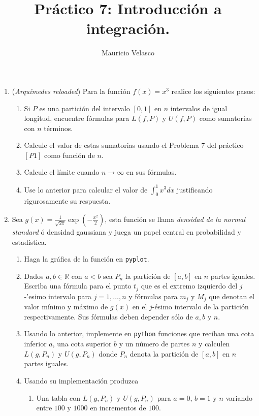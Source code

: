 \documentclass[12pt, a4paper]{article}
\date{}
\begin{document}
\title{Pr\'actico 7: Introducción a integración.}
\author{Mauricio Velasco}
\maketitle{}
\begin{enumerate}
\item ({\it Arquímedes reloaded}) Para la función $f(x)=x^3$ realice los siguientes pasos:
\begin{enumerate}
\item Si $P$ es una partición del intervalo $[0,1]$ en $n$ intervalos de igual longitud, encuentre fórmulas para $L(f,P)$ y $U(f,P)$ como sumatorias con $n$ términos.
\item Calcule el valor de estas sumatorias usando el Problema $7$ del práctico $[P1]$ como función de $n$.
\item Calcule el límite cuando $n\rightarrow \infty$ en sus f\'ormulas.
\item Use lo anterior para calcular el valor de $\int_0^1x^3 dx$ justificando rigurosamente su respuesta.
\end{enumerate}

\item Sea $g(x)=\frac{1}{\sqrt{2\pi}}\exp\left({-\frac{x^2}{2}}\right)$, esta función se llama \emph{densidad de la normal standard} ó densidad gaussiana y juega un papel central en probabilidad y estadística.
\begin{enumerate}
\item Haga la gráfica de la función en \verb!pyplot!. 

\item Dados $a,b\in \mathbb{R}$ con $a<b$ sea $P_n$ la partición de $[a,b]$ en $n$ partes iguales. Escriba una fórmula para el punto $t_j$ que es el extremo izquierdo del $j$-'esimo intervalo para $j=1,\dots, n$ y fórmulas para $m_j$ y $M_j$ que denotan el valor mínimo y máximo de $g(x)$ en el $j$-ésimo intervalo de la partición respectivamente. Sus fórmulas deben depender sólo de $a,b$ y $n$.

\item Usando lo anterior, implemente en \verb!python! funciones que reciban una cota inferior $a$, una cota superior $b$ y un número de partes $n$ y calculen $L(g,P_n)$ y $U(g,P_n)$ donde $P_n$ denota la partición de $[a,b]$ en $n$ partes iguales.

\item Usando su implementación produzca

\begin{enumerate}
\item Una tabla con $L(g,P_n)$ y $U(g,P_n)$ para $a=0$, $b=1$ y $n$ variando entre $100$ y $1000$ en incrementos de $100$.


\end{enumerate}
\end{enumerate}
\end{enumerate}
\end{document}
